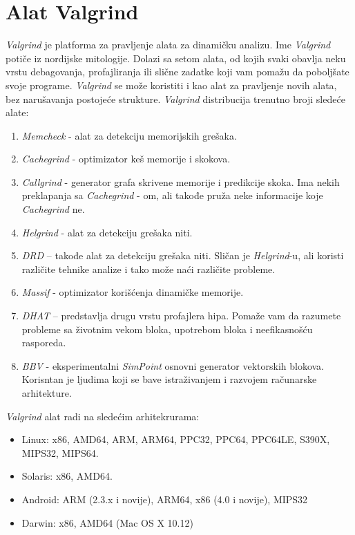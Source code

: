 \documentclass[12pt,oneside]{memoir}
\theoremstyle{plain}
\theoremstyle{definition}
\begin{document}
\chapter{Alat Valgrind}
\textit{Valgrind} je platforma za pravljenje alata za dinamičku analizu. Ime \textit{Valgrind} potiče iz nordijske mitologije.  Dolazi sa setom alata, od kojih svaki obavlja neku vrstu debagovanja, profajliranja ili slične zadatke koji vam pomažu da poboljšate svoje  programe. \textit{Valgrind} se može koristiti i kao alat za pravljenje novih alata, bez narušavanja postojeće strukture. 
\textit{Valgrind} distribucija trenutno broji sledeće alate:
\begin{enumerate}
  \item \textit{Memcheck} - alat za detekciju memorijskih grešaka.
  \item \textit{Cachegrind} - optimizator keš memorije i skokova. 
  \item \textit{Callgrind} - generator grafa skrivene memorije i predikcije skoka.  Ima nekih preklapanja sa \textit{Cachegrind} - om, ali takođe pruža neke informacije koje \textit{Cachegrind} ne.
  \item \textit{Helgrind} - alat za detekciju grešaka niti.
  \item \textit{DRD} – takođe alat za detekciju grešaka niti. Sličan je \textit{Helgrind}-u, ali koristi različite tehnike analize i tako može naći različite probleme.
  \item \textit{Massif} - optimizator korišćenja dinamičke memorije.
  \item \textit{DHAT} – predstavlja drugu vrstu profajlera hipa. Pomaže vam da razumete probleme sa životnim vekom bloka, upotrebom bloka i neefikasnošću rasporeda.
  \item \textit{BBV} -  eksperimentalni \textit{SimPoint} osnovni generator vektorskih blokova. Korisntan je ljudima koji se bave istraživanjem i razvojem računarske arhitekture.
\end{enumerate}
\textit{Valgrind} alat  radi na sledećim arhitekrurama:
\begin{itemize}
  \item Linux: x86, AMD64, ARM, ARM64, PPC32, PPC64, PPC64LE, S390X, MIPS32, MIPS64.
  \item Solaris: x86, AMD64. 
  \item Android: ARM (2.3.x i novije), ARM64, x86 (4.0 i novije), MIPS32 
  \item Darwin: x86, AMD64 (Mac OS X 10.12)\cite{Valgrind}
\end{itemize}
\end{document}
